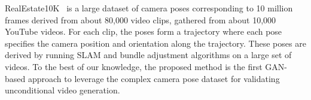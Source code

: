 RealEstate10K~\cite{zhou2018stereo} is a large dataset of camera poses corresponding to 10 million frames derived from about 80,000 video clips, gathered from about 10,000 YouTube videos. For each clip, the poses form a trajectory where each pose specifies the camera position and orientation along the trajectory. These poses are derived by running SLAM and bundle adjustment algorithms on a large set of videos. To the best of our knowledge, the proposed method is the first GAN-based approach to leverage the complex camera pose dataset for validating unconditional video generation. 




